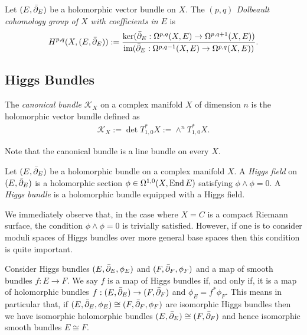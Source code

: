 \documentclass[12pt]{ociamthesis}  %
\begin{document}
\begin{definition}
  Let $(E,\bar{\partial}_E)$ be a holomorphic vector bundle on $X$. The
  \emph{$(p,q)$ Dolbeault cohomology group of $X$ with coefficients in
    $E$} is
  \begin{align*}
    H^{p,q}(X,(E,\bar{\partial}_E)) := \frac{
      \ker(\bar{\partial}_E : \Omega^{p,q}(X,E) \to \Omega^{p,q+1}(X,E))
    }{
      \operatorname{im}(\bar{\partial}_E : \Omega^{p,q-1}(X,E) \to \Omega^{p,q}(X,E))
    }.
  \end{align*}
\end{definition}

\subsection{Higgs Bundles}


\begin{definition}
  The \emph{canonical bundle} $\mathcal K_X$ on a complex manifold $X$
  of dimension $n$ is the holomorphic vector bundle defined as
  \begin{align*}
    \mathcal K_X := \det T^*_{1,0} X := \wedge^n T^*_{1,0} X.
  \end{align*}
\end{definition}

Note that the canonical bundle is a line bundle on every $X$.

\begin{definition}
  Let $(E,\bar{\partial}_E)$ be a holomorphic bundle on a complex manifold $X$.
  A \emph{Higgs field} on $(E,\bar{\partial}_E)$ is a holomorphic section
  $\phi \in \Omega^{1,0}(X,\operatorname{End} E)$ satisfying $\phi\wedge\phi = 0$.
  A \emph{Higgs bundle} is a holomorphic bundle equipped with
  a Higgs field.
\end{definition}
We immediately observe that, in the case where $X=C$ is a compact
Riemann surface, the condition $\phi\wedge\phi=0$ is trivially
satisfied. However, if one is to consider moduli spaces of Higgs bundles
over more general base spaces then this condition is quite important.

Consider Higgs bundles $(E,\bar{\partial}_E,\phi_E)$ and $(F,\bar{\partial}_F,\phi_F)$
and a map of smooth bundles $f:E\to F$. We say $f$ is a map of Higgs
bundles if, and only if, it is a map of holomorphic bundles
$f:(E,\bar{\partial}_E)\to (F,\bar{\partial}_F)$ and $\phi_E = f^*\phi_F$.
This means in particular that, if
$(E,\bar{\partial}_E,\phi_E)\cong(F,\bar{\partial}_F,\phi_F)$
are isomorphic Higgs bundles then we have isomorphic holomorphic bundles
$(E,\bar{\partial}_E)\cong(F,\bar{\partial}_F)$ and hence isomorphic smooth bundles
$E\cong F$.
\end{document}
